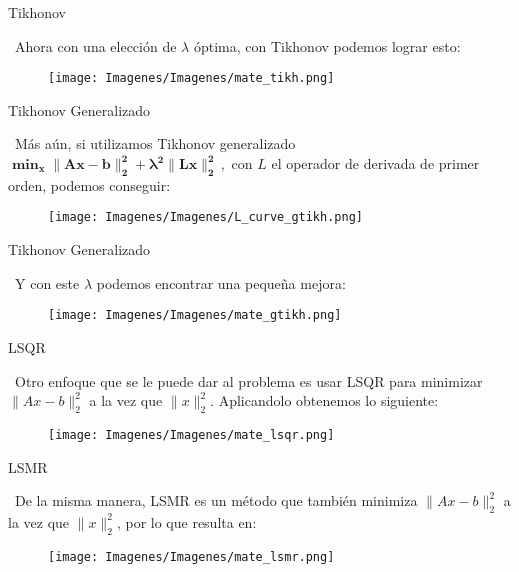 \documentclass[12pt]{beamer}
\begin{document}
	\begin{frame}{Tikhonov}
		
		\ Ahora con una elección de $\lambda$ óptima, con Tikhonov podemos lograr esto:
		
		\begin{figure}[htp]
			\centering
			\texttt{[image: Imagenes/Imagenes/mate\_tikh.png]}
		\end{figure}
		
	\end{frame}
	
	\begin{frame}{Tikhonov Generalizado}
		
		\ Más aún, si utilizamos Tikhonov generalizado $\mathbf{\min_{x} \|Ax-b\|_2^2 + \lambda^2 \|Lx\|_2^2}\,,$ con $L$ el operador de derivada de primer orden, podemos conseguir:
		
		\begin{figure}[htp]
			\centering
			\texttt{[image: Imagenes/Imagenes/L\_curve\_gtikh.png]}
		\end{figure}
		
	\end{frame}
	
	\begin{frame}{Tikhonov Generalizado}
		
		\ Y con este $\lambda$ podemos encontrar una pequeña mejora:
		
		\begin{figure}[htp]
			\centering
			\texttt{[image: Imagenes/Imagenes/mate\_gtikh.png]}
		\end{figure}
		
	\end{frame}
	
	\begin{frame}{LSQR}
		
		\ Otro enfoque que se le puede dar al problema es usar LSQR para minimizar $\|Ax-b\|_2^2$ a la vez que $\|x\|_2^2$. Aplicandolo obtenemos lo siguiente:
		
		\begin{figure}[htp]
			\centering
			\texttt{[image: Imagenes/Imagenes/mate\_lsqr.png]}
		\end{figure}
		
	\end{frame}
	
	\begin{frame}{LSMR}
		
		\ De la misma manera, LSMR es un método que también minimiza $\|Ax-b\|_2^2$ a la vez que $\|x\|_2^2$, por lo que resulta en:
		
		\begin{figure}[htp]
			\centering
			\texttt{[image: Imagenes/Imagenes/mate\_lsmr.png]}
		\end{figure}
		
	\end{frame}
	
\end{document}
